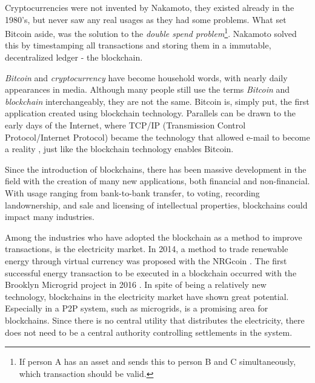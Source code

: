 Cryptocurrencies were not invented by Nakamoto, they existed already in the 1980's, but never saw any real usages as they had some problems. What set Bitcoin aside, was the solution to the \textit{double spend problem}\footnote{If person A has an asset and sends this to person B and C simultaneously, which transaction should be valid.}. Nakamoto solved this by timestamping all transactions and storing them in a immutable, decentralized ledger - the blockchain.

\textit{Bitcoin} and \textit{cryptocurrency} have become household words, with nearly daily appearances in media. Although many people still use the terms \textit{Bitcoin} and \textit{blockchain} interchangeably, they are not the same. Bitcoin is, simply put, the first application created using blockchain technology. Parallels can be drawn to the early days of the Internet, where TCP/IP (Transmission Control Protocol/Internet Protocol) became the technology that allowed e-mail to become a reality \cite{hbr_truth}, just like the blockchain technology enables Bitcoin. 

Since the introduction of blockchains, there has been massive development in the field with the creation of many new applications, both financial and non-financial. With usage ranging from bank-to-bank transfer, to voting, recording landownership, and sale and licensing of intellectual properties, blockchains could impact many industries. 
 
Among the industries who have adopted the blockchain as a method to improve transactions, is the electricity market. In 2014, a method to trade renewable energy through virtual currency was proposed with the NRGcoin \cite{NRGcoin_Mihaylov}. The first successful energy transaction to be executed in a blockchain occurred with the Brooklyn Microgrid project in 2016 \cite{bm101}. In spite of being a relatively new technology, blockchains in the electricity market have shown great potential. Especially in a P2P system, such as microgrids, is a promising area for blockchains. Since there is no central utility that distributes the electricity, there does not need to be a central authority controlling settlements in the system.


